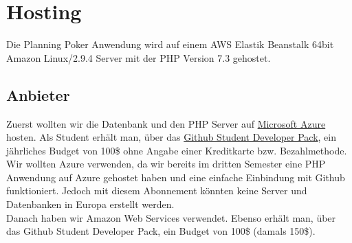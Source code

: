 \chapter{Hosting}\label{ch:hosting}
Die Planning Poker Anwendung wird auf einem AWS Elastik Beanstalk 64bit Amazon Linux/2.9.4 Server mit der PHP Version 7.3 gehostet.

\section{Anbieter}
Zuerst wollten wir die Datenbank und den PHP Server auf \href{https://azure.microsoft.com/de-de/}{Microsoft Azure} hosten. Als Student erhält man, über das \href{https://education.github.com/pack}{Github Student Developer Pack}, ein jährliches Budget von 100\$ ohne Angabe einer Kreditkarte bzw. Bezahlmethode. Wir wollten Azure verwenden, da wir bereits im dritten Semester eine PHP Anwendung auf Azure gehostet haben und eine einfache Einbindung mit Github funktioniert. Jedoch mit diesem Abonnement könnten keine Server und Datenbanken in Europa erstellt werden.\\
Danach haben wir Amazon Web Services verwendet. Ebenso erhält man, über das Github Student Developer Pack, ein Budget von 100\$ (damals 150\$).